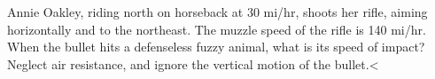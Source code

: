         Annie Oakley, riding north on horseback at 30 mi/hr,
        shoots her rifle, aiming horizontally and to the northeast. 
        The muzzle speed of the rifle is 140 mi/hr.  When the bullet
        hits a defenseless fuzzy animal, what is its speed of
        impact?  Neglect air resistance, and ignore the vertical
        motion of the bullet.<%
